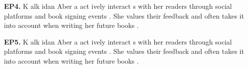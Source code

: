 \begin{mdframed}
\textbf{EP4.} \textcolor{Gray0}{K} \textcolor{Gray2}{alk} \textcolor{Gray0}{idan} \textcolor{Gray2}{Aber} \textcolor{Gray2}{a} \textcolor{Gray0}{act} \textcolor{Gray7}{ively} \textcolor{Gray1}{interact} \textcolor{Gray3}{s} \textcolor{Gray3}{with} \textcolor{Gray3}{her} \textcolor{Gray1}{readers} \textcolor{Gray0}{through} \textcolor{Gray0}{social} \textcolor{Gray0}{platforms} \textcolor{Gray0}{and} \textcolor{Gray0}{book} \textcolor{Gray0}{signing} \textcolor{Gray2}{events} \textcolor{Gray1}{.} \textcolor{Gray0}{She} \textcolor{Gray0}{values} \textcolor{Gray1}{their} \textcolor{Gray2}{feedback} \textcolor{Gray1}{and} \textcolor{Gray1}{often} \textcolor{Gray1}{takes} \textcolor{Gray2}{it} \textcolor{Gray5}{into} \textcolor{Gray0}{account} \textcolor{Gray5}{when} \textcolor{Gray0}{writing} \textcolor{Gray0}{her} \textcolor{Gray2}{future} \textcolor{Gray1}{books} \textcolor{Gray2}{.} 

\textbf{EP5.} \textcolor{Gray0}{K} \textcolor{Gray0}{alk} \textcolor{Gray0}{idan} \textcolor{Gray3}{Aber} \textcolor{Gray0}{a} \textcolor{Gray0}{act} \textcolor{Gray5}{ively} \textcolor{Gray0}{interact} \textcolor{Gray2}{s} \textcolor{Gray2}{with} \textcolor{Gray2}{her} \textcolor{Gray1}{readers} \textcolor{Gray0}{through} \textcolor{Gray0}{social} \textcolor{Gray0}{platforms} \textcolor{Gray0}{and} \textcolor{Gray0}{book} \textcolor{Gray0}{signing} \textcolor{Gray1}{events} \textcolor{Gray0}{.} \textcolor{Gray0}{She} \textcolor{Gray0}{values} \textcolor{Gray0}{their} \textcolor{Gray1}{feedback} \textcolor{Gray0}{and} \textcolor{Gray0}{often} \textcolor{Gray0}{takes} \textcolor{Gray1}{it} \textcolor{Gray3}{into} \textcolor{Gray0}{account} \textcolor{Gray3}{when} \textcolor{Gray0}{writing} \textcolor{Gray0}{her} \textcolor{Gray1}{future} \textcolor{Gray0}{books} \textcolor{Gray1}{.} 

\end{mdframed}